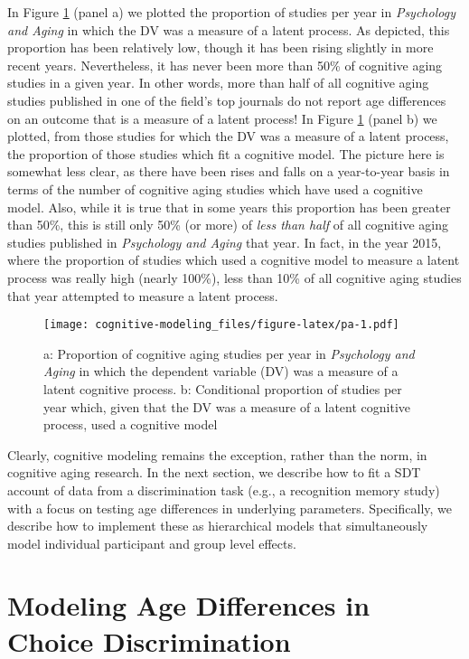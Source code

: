 \documentclass[
  english,
  ,man,floatsintext]{apa6}
\begin{document}
In Figure \ref{fig:pa} (panel a) we plotted the proportion of studies per year in \emph{Psychology and Aging} in which the DV was a measure of a latent process. As depicted, this proportion has been relatively low, though it has been rising slightly in more recent years. Nevertheless, it has never been more than 50\% of cognitive aging studies in a given year. In other words, more than half of all cognitive aging studies published in one of the field's top journals do not report age differences on an outcome that is a measure of a latent process! In Figure \ref{fig:pa} (panel b) we plotted, from those studies for which the DV was a measure of a latent process, the proportion of those studies which fit a cognitive model. The picture here is somewhat less clear, as there have been rises and falls on a year-to-year basis in terms of the number of cognitive aging studies which have used a cognitive model. Also, while it is true that in some years this proportion has been greater than 50\%, this is still only 50\% (or more) of \emph{less than half} of all cognitive aging studies published in \emph{Psychology and Aging} that year. In fact, in the year 2015, where the proportion of studies which used a cognitive model to measure a latent process was really high (nearly 100\%), less than 10\% of all cognitive aging studies that year attempted to measure a latent process.

\begin{figure}
\centering
\texttt{[image: cognitive-modeling\_files/figure-latex/pa-1.pdf]}
\caption{\label{fig:pa}a: Proportion of cognitive aging studies per year in \emph{Psychology and Aging} in which the dependent variable (DV) was a measure of a latent cognitive process. b: Conditional proportion of studies per year which, given that the DV was a measure of a latent cognitive process, used a cognitive model}
\end{figure}

Clearly, cognitive modeling remains the exception, rather than the norm, in cognitive aging research. In the next section, we describe how to fit a SDT account of data from a discrimination task (e.g., a recognition memory study) with a focus on testing age differences in underlying parameters. Specifically, we describe how to implement these as hierarchical models that simultaneously model individual participant and group level effects.

\hypertarget{modeling-age-differences-in-choice-discrimination}{%
\section{Modeling Age Differences in Choice Discrimination}\label{modeling-age-differences-in-choice-discrimination}}
\end{document}
